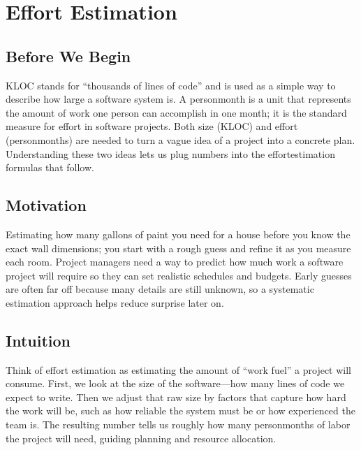 \documentclass[12pt, a4paper]{article}
\begin{document}
\section{Effort Estimation}

\subsection{Before We Begin}
KLOC stands for ``thousands of lines of code'' and is used as a simple way to describe how large a software system is.  
A personmonth is a unit that represents the amount of work one person can accomplish in one month; it is the standard measure for effort in software projects.  
Both size (KLOC) and effort (personmonths) are needed to turn a vague idea of a project into a concrete plan.  
Understanding these two ideas lets us plug numbers into the effortestimation formulas that follow.

\subsection{Motivation}
Estimating how many gallons of paint you need for a house before you know the exact wall dimensions; you start with a rough guess and refine it as you measure each room.  
Project managers need a way to predict how much work a software project will require so they can set realistic schedules and budgets.  
Early guesses are often far off because many details are still unknown, so a systematic estimation approach helps reduce surprise later on.

\subsection{Intuition}
Think of effort estimation as estimating the amount of ``work fuel'' a project will consume.  
First, we look at the size of the software---how many lines of code we expect to write.  
Then we adjust that raw size by factors that capture how hard the work will be, such as how reliable the system must be or how experienced the team is.  
The resulting number tells us roughly how many personmonths of labor the project will need, guiding planning and resource allocation.
\end{document}
